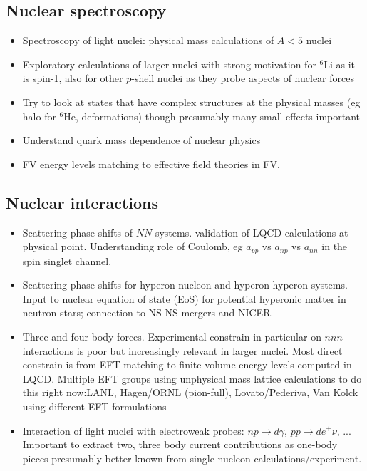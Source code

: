 
 


\subsection{Nuclear spectroscopy}

\begin{itemize}
	\item Spectroscopy of light nuclei: physical mass calculations of $A<5$ nuclei
	\item Exploratory calculations of larger nuclei with strong motivation for $^6$Li as it is spin-1, also for other $p$-shell nuclei as they probe aspects of nuclear forces 
	\item Try to look at states that have complex structures at the physical masses (eg halo for ${}^6$He, deformations) though presumably many small effects important 
	\item Understand quark mass dependence of nuclear physics
	\item FV energy levels matching to effective field theories in FV. 
	
\end{itemize}






\subsection{Nuclear interactions}

\begin{itemize}
	\item Scattering  phase shifts of $NN$ systems. validation of LQCD calculations at physical point. Understanding role of Coulomb, eg $a_{pp}$ vs $a_{np}$ vs $a_{nn}$ in the spin singlet channel.
	\item Scattering phase shifts for  hyperon-nucleon and hyperon-hyperon systems. Input to nuclear equation of state (EoS) for potential hyperonic matter in neutron stars; connection to NS-NS mergers and NICER.
	\item Three and four body forces. Experimental constrain in particular on $nnn$ interactions is poor but increasingly relevant in larger nuclei. Most direct constrain is from EFT matching to finite volume energy levels computed in LQCD. Multiple EFT groups using unphysical mass lattice calculations to do this right now:LANL, Hagen/ORNL (pion-full), Lovato/Pederiva, Van Kolck using different EFT formulations
	\item Interaction of light nuclei with electroweak probes: $np\to d\gamma$, $pp\to de^+\nu$, ... 
	Important to extract two, three body current contributions as one-body pieces presumably better known from single nucleon calculations/experiment.
\end{itemize}


